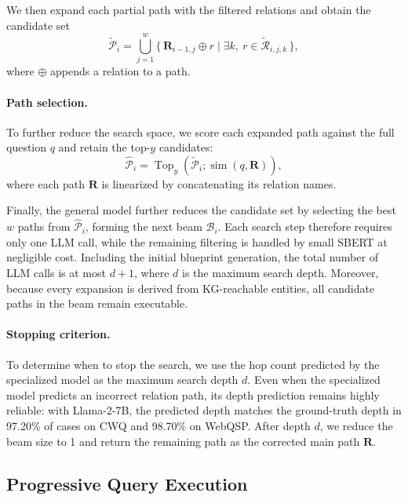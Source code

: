 \documentclass[11pt]{article}
\begin{document}
We then expand each partial path with the filtered relations and obtain the candidate set
\begin{equation}
\widetilde{\mathcal{P}}_i
=
\bigcup_{j=1}^{w}
\{\,\mathbf{R}_{i-1,j}\oplus r \mid \exists k,\ r\in\widetilde{\mathcal{R}}_{i,j,k}\,\},
\label{eq:expanded_paths}
\end{equation}
where $\oplus$ appends a relation to a path.

\paragraph{Path selection.}
To further reduce the search space, we score each expanded path against the full question $q$ and retain the top-$y$ candidates:
\begin{equation}
\widehat{\mathcal{P}}_i
=
\operatorname{Top}_y(\widetilde{\mathcal{P}}_i; \operatorname{sim}(q,\mathbf{R})),
\label{eq:path_filter}
\end{equation}
where each path $\mathbf{R}$ is linearized by concatenating its relation names.

Finally, the general model further reduces the candidate set by selecting the best $w$ paths from $\widehat{\mathcal{P}}_i$, forming the next beam $\mathcal{B}_i$. Each search step therefore requires only one LLM call, while the remaining filtering is handled by small SBERT at negligible cost. Including the initial blueprint generation, the total number of LLM calls is at most $d+1$, where $d$ is the maximum search depth. Moreover, because every expansion is derived from KG-reachable entities, all candidate paths in the beam remain executable.

\paragraph{Stopping criterion.}
To determine when to stop the search, we use the hop count predicted by the specialized model as the maximum search depth $d$. Even when the specialized model predicts an incorrect relation path, its depth prediction remains highly reliable: with Llama-2-7B, the predicted depth matches the ground-truth depth in 97.20\% of cases on CWQ and 98.70\% on WebQSP. After depth $d$, we reduce the beam size to 1 and return the remaining path as the corrected main path $\mathbf{R}$.


\subsection{Progressive Query Execution}
\label{sec:progressive_exec}
\end{document}
